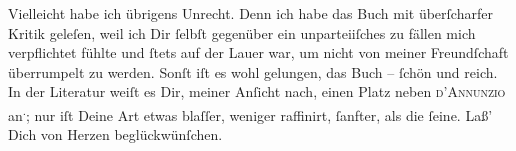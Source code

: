 \pstart
           Vielleicht habe ich übrigens Unrecht. Denn ich habe das Buch mit überſcharfer Kritik geleſen, weil ich
                  \strikeout{\textcolor{gray}{mir}} Dir{ }ſelbſt gegenüber ein unparteiiſches zu fällen mich verpflichtet fühlte und{ }ſtets auf der Lauer war, um nicht von meiner Freundſchaft überrumpelt zu werden.
               Sonſt iſt es wohl gelungen, das Buch –{ }ſchön und reich. In der Literatur {\pb}weiſt es Dir, meiner Anſicht nach, einen Platz neben \textsc{d’Annunzio} an\substVorne{}\textsuperscript{.}\substDazwischen{};\substHinten{} nur iſt Deine Art etwas blaſſer, weniger raffinirt,{ }ſanfter, als die{ }ſeine.
               Laß’ Dich von Herzen beglückwünſchen.\pend
           
